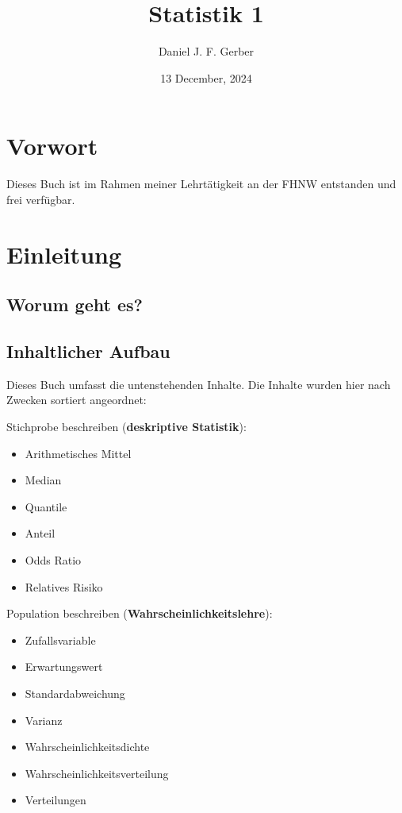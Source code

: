 \documentclass[
]{book}
\title{Statistik 1}
\author{Daniel J. F. Gerber}
\date{13 December, 2024}
\providecommand{\tightlist}{%
  \setlength{\itemsep}{0pt}\setlength{\parskip}{0pt}}
\theoremstyle{definition}
\theoremstyle{definition}
\theoremstyle{definition}
\theoremstyle{definition}
\theoremstyle{remark}
\begin{document}
\maketitle

{
\setcounter{tocdepth}{1}
\tableofcontents
}
\chapter*{Vorwort}\label{vorwort}

Dieses Buch ist im Rahmen meiner Lehrtätigkeit an der FHNW entstanden und frei verfügbar.

\chapter{Einleitung}\label{einleitung}

\section{Worum geht es?}\label{worum-geht-es}

\section{Inhaltlicher Aufbau}\label{inhaltlicher-aufbau}

Dieses Buch umfasst die untenstehenden Inhalte. Die Inhalte wurden hier nach Zwecken sortiert angeordnet:

Stichprobe beschreiben (\textbf{deskriptive Statistik}):

\begin{itemize}
\tightlist
\item
  Arithmetisches Mittel
\item
  Median
\item
  Quantile
\item
  Anteil
\item
  Odds Ratio
\item
  Relatives Risiko
\end{itemize}

Population beschreiben (\textbf{Wahrscheinlichkeitslehre}):

\begin{itemize}
\tightlist
\item
  Zufallsvariable
\item
  Erwartungswert
\item
  Standardabweichung
\item
  Varianz
\item
  Wahrscheinlichkeitsdichte
\item
  Wahrscheinlichkeitsverteilung
\item
  Verteilungen
\end{itemize}
\end{document}

